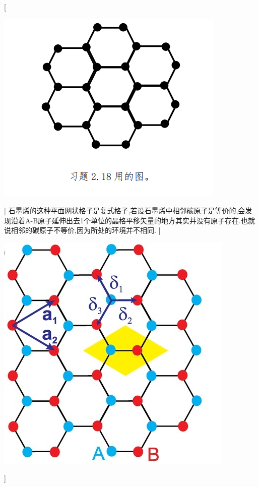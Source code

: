\documentclass[UTF8,10pt,a4paper,oneside]{ctexart}
\begin{document}
    [ \begin{center} \includegraphics{picture/2-19-1.png}\end{center}]
    {石墨烯的这种平面网状格子是复式格子,若设石墨烯中相邻碳原子是等价的,会发现沿着A-B原子延伸出去1个单位的晶格平移矢量的地方其实并没有原子存在.也就说相邻的碳原子不等价,因为所处的环境并不相同.}
    [ \begin{center}\includegraphics[scale=0.5]{picture/2-19-2.png} \end{center}]
        
\end{document}
